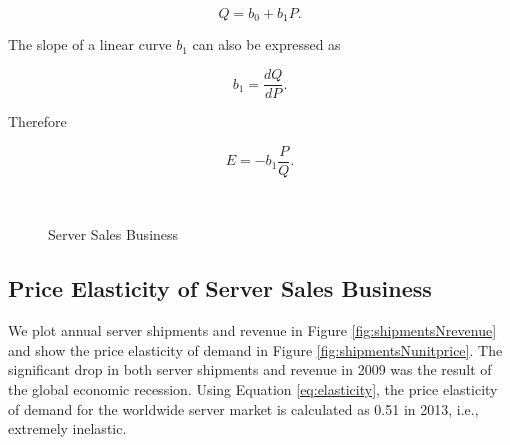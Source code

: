 \documentclass[10pt,journal,cspaper,compsoc]{IEEEtran}
\begin{document}
\begin{equation}
Q = b_0 + b_1 P .
\end{equation}

The slope of a linear curve $b_1$ can also be expressed as

\begin{equation}
b_1 = \frac{dQ}{dP} .
\end{equation}

Therefore

\begin{equation}
\label{eq:elasticity}
E = - b_1  \frac{P}{Q} .
\end{equation}

\begin{figure}[h]
 \\
 \caption{Server Sales Business} 
\end{figure}



\subsection{Price Elasticity of Server Sales Business}
\label{sec:priceServerSales}

We plot annual server shipments and revenue in Figure \ref{fig:shipmentsNrevenue} and show the price elasticity of demand in Figure \ref{fig:shipmentsNunitprice}.
The significant drop in both server shipments and revenue in 2009 was the result of the global economic recession. %
Using Equation \ref{eq:elasticity}, the price elasticity of demand for the worldwide server market is calculated as 0.51 in 2013, i.e., extremely inelastic. 
\end{document}
